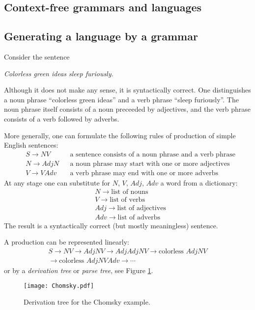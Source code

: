\begin{page}

\section{Context-free grammars and languages}
\subsection{Generating a language by a grammar}
\label{sec:LangGram}
Consider the sentence
\begin{center}
\emph{Colorless green ideas sleep furiously.}
\end{center}
Although it does not make any sense, it is syntactically correct.
One distinguishes a noun phrase ``colorless green ideas'' and a verb phrase ``sleep furiously''.
The noun phrase itself consists of a noun preceeded by adjectives, and the verb phrase consists of a verb followed by adverbs.

More generally, one can formulate the following rules of production of simple English sentences:
\begin{align*}
&S \to NV &&\text{a sentence consists of a noun phrase and a verb phrase}\\
&N \to AdjN &&\text{a noun phrase may start with one or more adjectives}\\
&V \to VAdv &&\text{a verb phrase may end with one or more adverbs}
\end{align*}
At any stage one can substitute for $N$, $V$, $Adj$, $Adv$ a word from a dictionary:
\begin{align*}
&N \to \text{list of nouns}\\
&V \to \text{list of verbs}\\
&Adj \to \text{list of adjectives}\\
&Adv \to \text{list of adverbs}
\end{align*}
The result is a syntactically correct (but mostly meaningless) sentence.

A production can be represented linearly:
\begin{multline*}
S \to NV \to AdjNV \to AdjAdjNV \to \text{colorless }AdjNV\\
\to \text{colorless }AdjNVAdv \to \cdots 
\end{multline*}
or by a \emph{derivation tree} or \emph{parse tree}, see Figure \ref{fig:Chomsky}.

\begin{figure}[ht]
\begin{center}
\texttt{[image: Chomsky.pdf]}
\end{center}
\caption{Derivation tree for the Chomsky example.}
\label{fig:Chomsky}
\end{figure}


\end{page}
